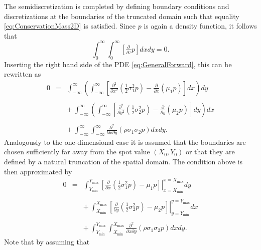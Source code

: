 \documentclass[10pt]{article}
\begin{document}
The semidiscretization is completed by defining boundary conditions and discretizations at the boundaries of the truncated domain such that equality \eqref{eq:ConservationMass2D} is satisfied.
Since $p$ is again a density function, it follows that
$$ \int_{0}^{\infty}\int_{0}^{\infty} \left[ \tfrac{\partial}{\partial \tau} p \right] dx dy = 0. $$
Inserting the right hand side of the PDE \eqref{eq:GeneralForward}, this can be rewritten as
\begin{eqnarray*}
0 &=& \int_{-\infty}^{\infty} \left( \int_{-\infty}^{\infty} \left[ \tfrac{\partial^{2}}{\partial x^{2}} \left(\tfrac{1}{2} \sigma^{2}_{1}p \right) -  \tfrac{\partial}{\partial x} \left( \mu_{1} p \right) \right] dx \right) dy \\\\
&& + \ \int_{-\infty}^{\infty} \left( \int_{-\infty}^{\infty} \left[ \tfrac{\partial^{2}}{\partial y^{2}} \left( \tfrac{1}{2} \sigma_{2}^{2} p \right) - \tfrac{\partial}{\partial y} \left( \mu_{2} p \right) \right] dy \right) dx \\\\
&& + \ \int_{-\infty}^{\infty}\int_{-\infty}^{\infty} \tfrac{\partial^{2}}{\partial x \partial y} \left( \rho \sigma_{1}\sigma_{2} p \right) dx dy.
\end{eqnarray*}
Analogously to the one-dimensional case it is assumed that the boundaries are chosen sufficiently far away from the spot value $(X_{0},Y_{0})$ or that they are defined by a natural truncation of the spatial domain. 
The condition above is then approximated by
\begin{eqnarray}
0 &=& \int_{Y_{\min}}^{Y_{\max}} \left. \left[ \tfrac{\partial}{\partial x} \left(\tfrac{1}{2} \sigma^{2}_{1}p \right) - \mu_{1} p \right]\right\vert_{x=X_{\min}}^{x=X_{\max}} dy \nonumber \\ \nonumber \\
&& + \ \int_{X_{\min}}^{X_{\max}} \left. \left[ \tfrac{\partial}{\partial y} \left(\tfrac{1}{2} \sigma^{2}_{2}p \right) - \mu_{2} p \right] \right\vert_{y=Y_{\min}}^{y=Y_{\max}} dx \nonumber \\ \nonumber \\
&& + \ \int_{Y_{\min}}^{Y_{\max}}\int_{X_{\min}}^{X_{\max}} \tfrac{\partial^{2}}{\partial x \partial y} \left( \rho \sigma_{1}\sigma_{2} p \right) dx dy. \label{eq:BC2D}
\end{eqnarray}
Note that by assuming that
\end{document}
